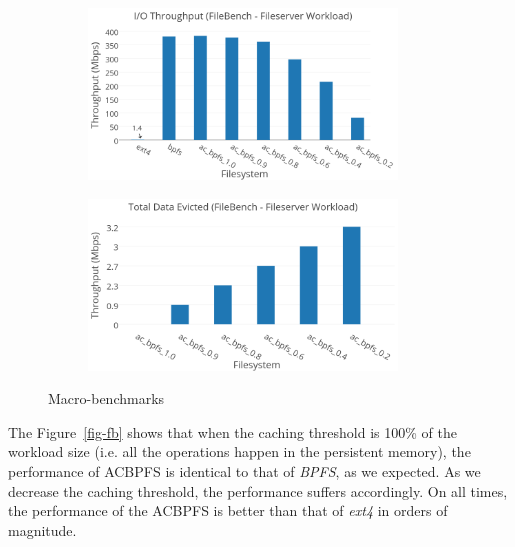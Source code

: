  \begin{figure}[t]\centering

\begin{subfigure}{.49\textwidth}
\centering
\includegraphics[width=0.9\textwidth]{figs/filebench.png}
\end{subfigure}
\begin{subfigure}{.49\textwidth}
\centering
\includegraphics[width=0.9\textwidth]{figs/bench2.png}
\end{subfigure}

\caption{Macro-benchmarks}
\label{fig1:fig1}
\end{figure}

The Figure~\ref{fig-fb} shows that when the caching threshold is 100\% of the workload size (i.e. all the operations happen in the persistent memory), the performance of AC\-BPFS is identical to that of \textit{BPFS}, as we expected. As we decrease the caching threshold, the performance suffers accordingly. On all times, the performance of the AC\-BPFS is better than that of  \textit{ext4}  in orders of magnitude.
